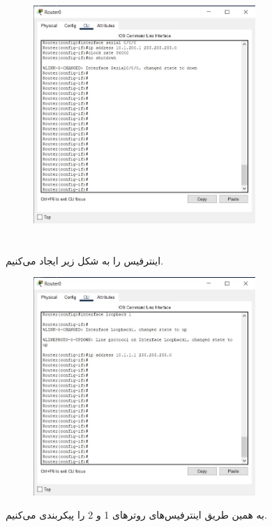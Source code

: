 \documentclass{article}
\begin{document}
\begin{figure}[H]
    \centering
    \includegraphics[width=0.75\textwidth]{figures/3.jpg}
    \caption{}
    \label{fig:fig1}
\end{figure}


\section{}%
اینترفیس  را به شکل زیر ایجاد می‌کنیم.
\begin{figure}[H]
    \centering
    \includegraphics[width=0.75\textwidth]{figures/4.jpg}
    \caption{}
    \label{fig:fig1}
\end{figure}
به همین طریق اینترفیس‌های  روترهای 1 و 2 را پیکربندی می‌کنیم.
\end{document}

